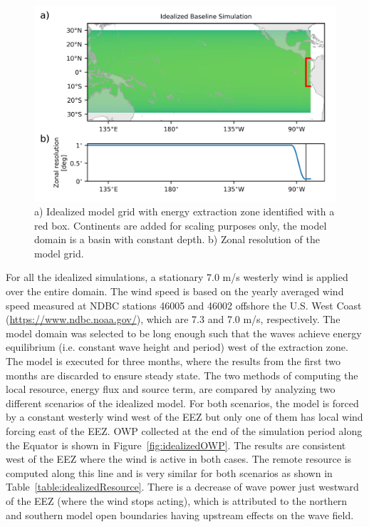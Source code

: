 \begin{figure}[ht]
  \includegraphics[width=5in]{../diagram/appendixB_Figure1.png}
  \caption{a) Idealized model grid with energy extraction zone identified with a red box. Continents are added for scaling purposes only, the model domain is a basin with constant depth. b) Zonal resolution of the model grid.}
  \label{fig:idealizedDomain}
\end{figure}

For all the idealized simulations, a stationary 7.0 m/s westerly wind is applied over the entire domain. The wind speed is based on the yearly averaged wind speed measured at NDBC stations 46005 and 46002 offshore the U.S. West Coast (\url{https://www.ndbc.noaa.gov/}), which are 7.3 and 7.0 m/s, respectively. The model domain was selected to be long enough such that the waves achieve energy equilibrium (i.e. constant wave height and period) west of the extraction zone. The model is executed for three months, where the results from the first two months are discarded to ensure steady state. The two methods of computing the local resource, energy flux and source term, are compared by analyzing two different scenarios of the idealized model. For both scenarios, the model is forced by a constant westerly wind west of the EEZ but only one of them has local wind forcing east of the EEZ. OWP collected at the end of the simulation period along the Equator is shown in Figure~\ref{fig:idealizedOWP}. The results are consistent west of the EEZ where the wind is active in both cases. The remote resource is computed along this line and is very similar for both scenarios as shown in Table~\ref{table:idealizedResource}. There is a decrease of wave power just westward of the EEZ (where the wind stops acting), which is attributed to the northern and southern model open boundaries having upstream effects on the wave field.

